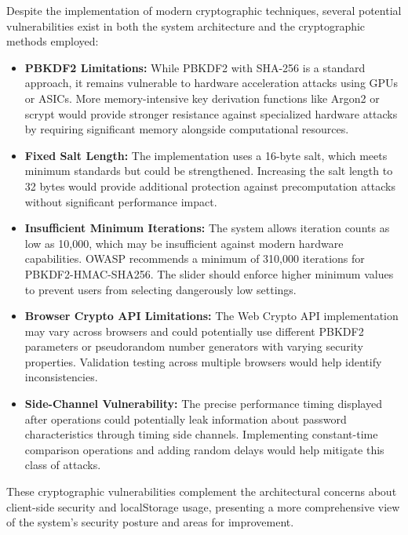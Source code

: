 \documentclass[11pt,a4paper]{article}
\begin{document}
Despite the implementation of modern cryptographic techniques, several potential vulnerabilities exist in both the system architecture and the cryptographic methods employed:

\begin{itemize}
   \item \textbf{PBKDF2 Limitations:} While PBKDF2 with SHA-256 is a standard approach, it remains vulnerable to hardware acceleration attacks using GPUs or ASICs. More memory-intensive key derivation functions like Argon2 or scrypt would provide stronger resistance against specialized hardware attacks by requiring significant memory alongside computational resources.
   
   \item \textbf{Fixed Salt Length:} The implementation uses a 16-byte salt, which meets minimum standards but could be strengthened. Increasing the salt length to 32 bytes would provide additional protection against precomputation attacks without significant performance impact.
   
   \item \textbf{Insufficient Minimum Iterations:} The system allows iteration counts as low as 10,000, which may be insufficient against modern hardware capabilities. OWASP recommends a minimum of 310,000 iterations for PBKDF2-HMAC-SHA256. The slider should enforce higher minimum values to prevent users from selecting dangerously low settings.
   
   \item \textbf{Browser Crypto API Limitations:} The Web Crypto API implementation may vary across browsers and could potentially use different PBKDF2 parameters or pseudorandom number generators with varying security properties. Validation testing across multiple browsers would help identify inconsistencies.
   
   \item \textbf{Side-Channel Vulnerability:} The precise performance timing displayed after operations could potentially leak information about password characteristics through timing side channels. Implementing constant-time comparison operations and adding random delays would help mitigate this class of attacks.
\end{itemize}

These cryptographic vulnerabilities complement the architectural concerns about client-side security and localStorage usage, presenting a more comprehensive view of the system's security posture and areas for improvement.
\end{document}
